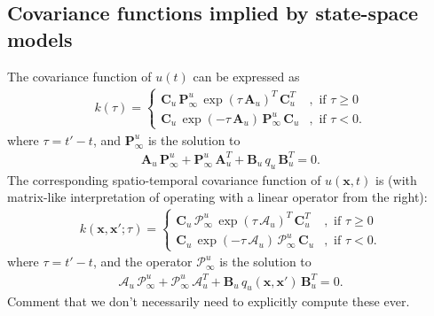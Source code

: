 \documentclass[journal]{IEEEtran}
\newcommand{\simo}[1]{{\color{red}#1}}
\begin{document}
\subsection{Covariance functions implied by state-space models}
%
The covariance function of $u(t)$ can be expressed as
%
\begin{equation}
\begin{split}
  k(\tau) = \begin{cases}
    \mathbf{C}_u \, \mathbf{P}^u_\infty \, \exp(\tau \, \mathbf{A}_u)^T \, \mathbf{C}_u^T &,
    \text{ if } \tau \ge 0 \\
    \mathbf{C}_u \, \exp(-\tau \, \mathbf{A}_u) \, \mathbf{P}^u_\infty \, \mathbf{C}_u &,
    \text{ if } \tau < 0.
  \end{cases}
\end{split}
\end{equation}
%
where $\tau = t' - t$, and $\mathbf{P}^u_\infty$ is the solution to
%
\begin{equation}
\begin{split}
  \mathbf{A}_u \, \mathbf{P}^u_\infty + \mathbf{P}^u_\infty \, \mathbf{A}_u^T
  + \mathbf{B}_u \, q_u \, \mathbf{B}_u^T = 0.
\end{split}
\end{equation}
%
The corresponding spatio-temporal covariance function of $u(\mathbf{x},t)$ is (with matrix-like interpretation of operating with a linear operator from the right):
%
\begin{equation}
\begin{split}
  k(\mathbf{x},\mathbf{x}';\tau) = \begin{cases}
    \mathbf{C}_u \, \mathcal{P}^u_\infty \, \exp(\tau \, \mathcal{A}_u)^T \, \mathbf{C}_u^T &,
    \text{ if } \tau \ge 0 \\
    \mathbf{C}_u \, \exp(-\tau \, \mathcal{A}_u) \, \mathcal{P}^u_\infty \, \mathbf{C}_u &,
    \text{ if } \tau < 0.
  \end{cases}
\end{split}
\end{equation}
%
where $\tau = t' - t$, and the operator $\mathcal{P}^u_\infty$ is the solution to
%
\begin{equation}
\begin{split}
  \mathcal{A}_u \, \mathcal{P}^u_\infty + \mathcal{P}^u_\infty \, \mathcal{A}_u^T
  + \mathbf{B}_u \, q_u(\mathbf{x},\mathbf{x}') \, \mathbf{B}_u^T = 0.
\end{split}
\end{equation}
%
\simo{Comment that we don't necessarily need to explicitly compute these ever.}
\end{document}
